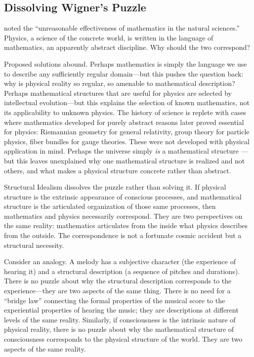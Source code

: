 \documentclass[11pt,a4paper]{article}
\theoremstyle{definition}
\theoremstyle{plain}
\theoremstyle{remark}
\begin{document}
\subsection{Dissolving Wigner's Puzzle}\label{sec:wigner}

\citet{Wigner1960} noted the ``unreasonable effectiveness of mathematics in the natural sciences.'' Physics, a science of the concrete world, is written in the language of mathematics, an apparently abstract discipline. Why should the two correspond?

Proposed solutions abound. Perhaps mathematics is simply the language we use to describe any sufficiently regular domain---but this pushes the question back: why is physical reality so regular, so amenable to mathematical description? Perhaps mathematical structures that are useful for physics are selected by intellectual evolution---but this explains the selection of known mathematics, not its applicability to unknown physics. The history of science is replete with cases where mathematics developed for purely abstract reasons later proved essential for physics: Riemannian geometry for general relativity, group theory for particle physics, fiber bundles for gauge theories. These were not developed with physical application in mind. Perhaps the universe simply \textit{is} a mathematical structure \citep{Tegmark2014}---but this leaves unexplained why one mathematical structure is realized and not others, and what makes a physical structure concrete rather than abstract.

Structural Idealism dissolves the puzzle rather than solving it. If physical structure is the extrinsic appearance of conscious processes, and mathematical structure is the articulated organization of those same processes, then mathematics and physics necessarily correspond. They are two perspectives on the same reality: mathematics articulates from the inside what physics describes from the outside. The correspondence is not a fortunate cosmic accident but a structural necessity.

Consider an analogy. A melody has a subjective character (the experience of hearing it) and a structural description (a sequence of pitches and durations). There is no puzzle about why the structural description corresponds to the experience---they are two aspects of the same thing. There is no need for a ``bridge law'' connecting the formal properties of the musical score to the experiential properties of hearing the music; they are descriptions at different levels of the same reality. Similarly, if consciousness is the intrinsic nature of physical reality, there is no puzzle about why the mathematical structure of consciousness corresponds to the physical structure of the world. They are two aspects of the same reality.
\end{document}
